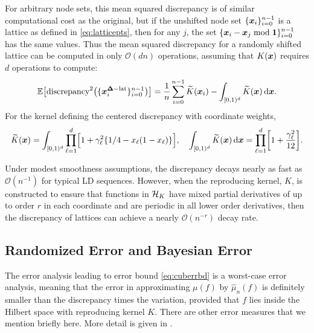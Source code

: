 \documentclass{svproc}
\begin{document}
For arbitrary node sets, this mean squared discrepancy is of similar computational cost as the original, but if the unshifted node set $\{{\boldsymbol{x}}_i\}_{i=0}^{n-1}$ is a lattice as defined in \eqref{eq:latticepts}, then for any $j$, the set $\{{\boldsymbol{x}}_i - {\boldsymbol{x}}_j \bmod {\boldsymbol{1}} \}_{i=0}^{n-1}$ has the same values.  Thus the mean squared discrepancy for a randomly shifted lattice can be computed in only $\mathcal{O}(dn)$ operations, assuming that $K({\boldsymbol{x}})$ requires $d$ operations to compute:
\begin{equation}
\mathbb{E}\bigl[\text{discrepancy}^2 \bigl (\{ {\boldsymbol{x}}^{{\boldsymbol{\Delta}}-\text{lat}}_{i} \}_{i=0}^{n-1} \bigr) \bigr] = \frac{1}{n} \sum_{i=0}^{n-1}  \widetilde{K}({\boldsymbol{x}}_i) - \int_{[0,1)^d} \widetilde{K}({\boldsymbol{x}}) \, \mathrm{d} {\boldsymbol{x}}. 
\end{equation}
For the kernel defining the centered discrepancy with coordinate weights, 
\begin{equation}
    \widetilde{K}({\boldsymbol{x}}) = \int_{[0,1)^d} \prod_{\ell = 1}^d \Bigl [ 1 + \gamma_\ell^2 \{ 1/4 - x_\ell (1-x_\ell ) \} \Bigr], \quad \int_{[0,1)^d} \widetilde{K}({\boldsymbol{x}}) \, \mathrm{d} {\boldsymbol{x}} = \prod_{\ell = 1}^d \biggl [ 1 + \frac{\gamma_\ell^2}{12} \biggr ].
\end{equation}

Under modest smoothness assumptions, the discrepancy decays nearly as fast as $\mathcal{O}(n^{-1})$ for typical LD sequences.  However, when the reproducing kernel, $K$, is constructed to ensure that functions in ${\mathcal{H}}_K$ have mixed partial derivatives of up to order $r$ in each coordinate and are periodic in all lower order derivatives, then the discrepancy of lattices can achieve a nearly $\mathcal{O}(n^{-r})$ decay rate.



\subsection{Randomized Error and Bayesian Error}
The error analysis leading to error bound \eqref{eq:cuberrbd} is a worst-case error analysis, meaning that the error in approximating $\mu(f)$ by $\hat{\mu}_n(f)$ is definitely smaller than the discrepancy times the variation, provided that $f$ lies inside the Hilbert space with reproducing kernel $K$.  There are other error measures that we mention briefly here.  More detail is given in \cite{HicEtal17a}.
\end{document}
